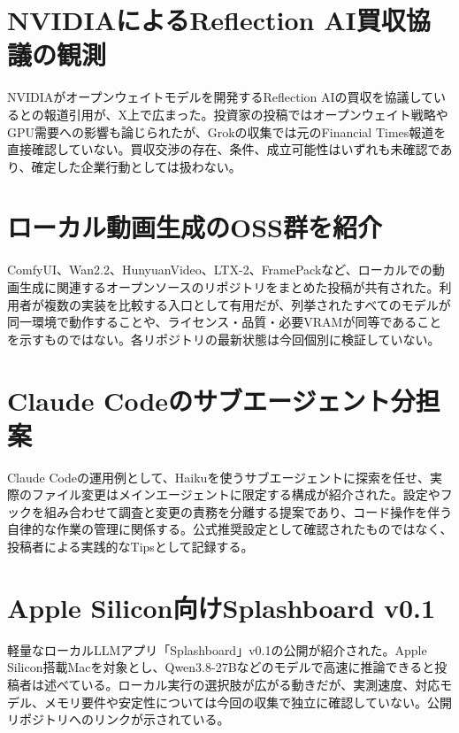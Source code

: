 \section{NVIDIAによるReflection AI買収協議の観測}
NVIDIAがオープンウェイトモデルを開発するReflection AIの買収を協議しているとの報道引用が、X上で広まった。投資家の投稿ではオープンウェイト戦略やGPU需要への影響も論じられたが、Grokの収集では元のFinancial Times報道を直接確認していない。買収交渉の存在、条件、成立可能性はいずれも未確認であり、確定した企業行動としては扱わない。

\section{ローカル動画生成のOSS群を紹介}
ComfyUI、Wan2.2、HunyuanVideo、LTX-2、FramePackなど、ローカルでの動画生成に関連するオープンソースのリポジトリをまとめた投稿が共有された。利用者が複数の実装を比較する入口として有用だが、列挙されたすべてのモデルが同一環境で動作することや、ライセンス・品質・必要VRAMが同等であることを示すものではない。各リポジトリの最新状態は今回個別に検証していない。

\section{Claude Codeのサブエージェント分担案}
Claude Codeの運用例として、Haikuを使うサブエージェントに探索を任せ、実際のファイル変更はメインエージェントに限定する構成が紹介された。設定やフックを組み合わせて調査と変更の責務を分離する提案であり、コード操作を伴う自律的な作業の管理に関係する。公式推奨設定として確認されたものではなく、投稿者による実践的なTipsとして記録する。

\section{Apple Silicon向けSplashboard v0.1}
軽量なローカルLLMアプリ「Splashboard」v0.1の公開が紹介された。Apple Silicon搭載Macを対象とし、Qwen3.8-27Bなどのモデルで高速に推論できると投稿者は述べている。ローカル実行の選択肢が広がる動きだが、実測速度、対応モデル、メモリ要件や安定性については今回の収集で独立に確認していない。公開リポジトリへのリンクが示されている。

